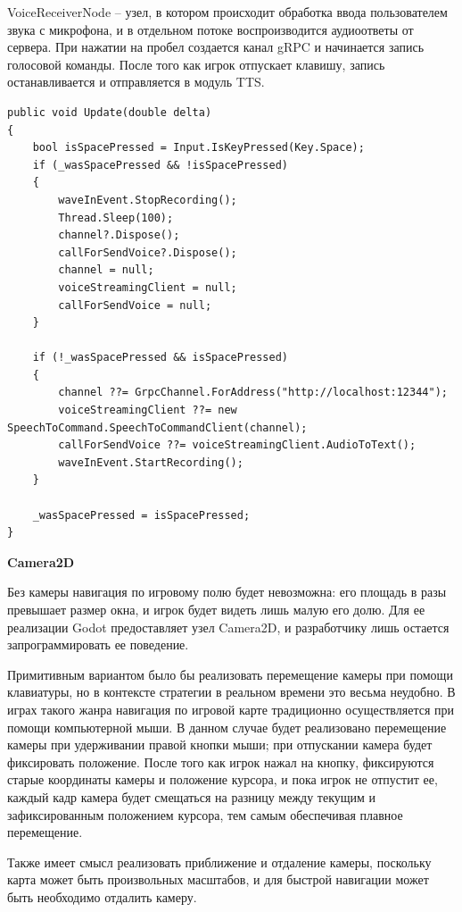             VoiceReceiverNode -- узел, в котором происходит обработка ввода пользователем звука с микрофона, и в отдельном потоке воспроизводится аудиоответы от сервера. При нажатии на пробел создается канал gRPC и начинается запись голосовой команды. После того как игрок отпускает клавишу, запись останавливается и отправляется в модуль TTS.
            \begin{lstlisting}[caption=Цикл обработки голосового ввода]
public void Update(double delta)
{
    bool isSpacePressed = Input.IsKeyPressed(Key.Space);
    if (_wasSpacePressed && !isSpacePressed)
    {
        waveInEvent.StopRecording();
        Thread.Sleep(100);
        channel?.Dispose();
        callForSendVoice?.Dispose();
        channel = null;
        voiceStreamingClient = null;
        callForSendVoice = null;
    }

    if (!_wasSpacePressed && isSpacePressed)
    {
        channel ??= GrpcChannel.ForAddress("http://localhost:12344");
        voiceStreamingClient ??= new SpeechToCommand.SpeechToCommandClient(channel);
        callForSendVoice ??= voiceStreamingClient.AudioToText();
        waveInEvent.StartRecording();
    }

    _wasSpacePressed = isSpacePressed;
}
            \end{lstlisting}
            
            \textbf{Camera2D}

            Без камеры навигация по игровому полю будет невозможна: его площадь в разы превышает размер окна, и игрок будет видеть лишь малую его долю. Для ее реализации Godot предоставляет узел Camera2D, и разработчику лишь остается запрограммировать ее поведение.

            Примитивным вариантом было бы реализовать перемещение камеры при помощи клавиатуры, но в контексте стратегии в реальном времени это весьма неудобно. В играх такого жанра навигация по игровой карте традиционно осуществляется при помощи компьютерной мыши. В данном случае будет реализовано перемещение камеры при удерживании правой кнопки мыши; при отпускании камера будет фиксировать положение. После того как игрок нажал на кнопку, фиксируются старые координаты камеры и положение курсора, и пока игрок не отпустит ее, каждый кадр камера будет смещаться на разницу между текущим и зафиксированным положением курсора, тем самым обеспечивая плавное перемещение.

            Также имеет смысл реализовать приближение и отдаление камеры, поскольку карта может быть произвольных масштабов, и для быстрой навигации может быть необходимо отдалить камеру.

